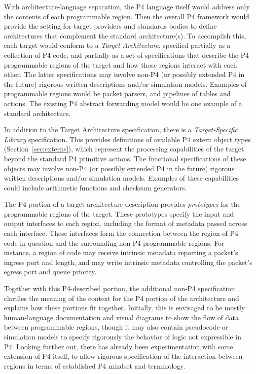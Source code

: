 With architecture-language separation, the P4 language itself would address
only the contents of each programmable region.  Then the overall P4 framework
would provide the setting for target providers and standards bodies to
define architectures that complement the standard architecture(s).  To
accomplish this, each target would conform to a
\textit{Target Architecture}, specified partially as a collection of
P4 code, and partially as a set of specifications that describe the
P4-programmable regions of the target and how those regions interact with
each other.  The latter specifications may involve non-P4 (or possibly
extended P4 in the future) rigorous written descriptions and/or simulation
models.  Examples of programmable regions would be packet parsers, and
pipelines of tables and actions.  The existing P4 abstract forwarding model
would be one example of a standard architecture.

In addition to the Target Architecture specification, there is a
\textit{Target-Specific Library} specification.  This provides definitions
of available P4 extern object types (Section~\ref{sec:externs}), which
represent the processing capabilities of the target beyond the standard P4
primitive actions.  The functional specifications of these objects may involve
non-P4 (or possibly extended P4 in the future) rigorous written descriptions
and/or simulation models.  Examples of these capabilities could include
arithmetic functions and checksum generators.


The P4 portion of a target architecture description provides
\textit{prototypes} for the programmable regions of the target. These
prototypes specify the input and output interfaces to each region, including
the format of metadata passed across each interface.  These interfaces form
the connection between the region of P4 code in question and the surrounding
non-P4-programmable regions.  For instance, a region of code may receive
intrinsic metadata reporting a packet's ingress port and length, and may write
intrinsic metadata controlling the packet's egress port and queue priority.

Together with this P4-described portion, the additional non-P4
specification clarifies the meaning of the context for the P4 portion of
the architecture and explains how these portions fit together.  Initially, this
is envisaged to be mostly human-language documentation and visual diagrams to
show the flow of data between programmable regions, though it may also
contain pseudocode or simulation models to specify rigorously the behavior of
logic not expressible in P4.  Looking further out, there has already been
experimentation with some extension of P4 itself, to allow rigorous
specification of the interaction between regions in terms of established
P4 mindset and terminology.


